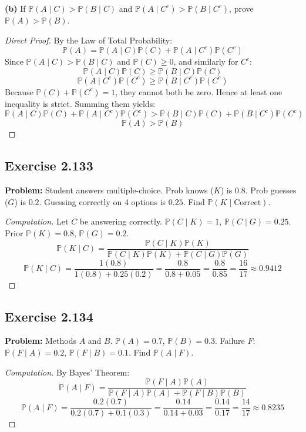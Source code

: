 \documentclass[12pt]{article}
\theoremstyle{definition}
\theoremstyle{remark}
\newcommand{\Pbb}{\mathbb{P}}
\begin{document}
\textbf{(b)} If $\Pbb(A \mid C) > \Pbb(B \mid C)$ and $\Pbb(A \mid C^c) > \Pbb(B \mid C^c)$, prove $\Pbb(A) > \Pbb(B)$.
\begin{proof}[Direct Proof]
By the Law of Total Probability:
\[ \Pbb(A) = \Pbb(A \mid C)\Pbb(C) + \Pbb(A \mid C^c)\Pbb(C^c) \]
Since $\Pbb(A \mid C) > \Pbb(B \mid C)$ and $\Pbb(C) \ge 0$, and similarly for $C^c$:
\[ \Pbb(A \mid C)\Pbb(C) \ge \Pbb(B \mid C)\Pbb(C) \]
\[ \Pbb(A \mid C^c)\Pbb(C^c) \ge \Pbb(B \mid C^c)\Pbb(C^c) \]
Because $\Pbb(C) + \Pbb(C^c) = 1$, they cannot both be zero. Hence at least one inequality is strict. Summing them yields:
\[ \Pbb(A \mid C)\Pbb(C) + \Pbb(A \mid C^c)\Pbb(C^c) > \Pbb(B \mid C)\Pbb(C) + \Pbb(B \mid C^c)\Pbb(C^c) \]
\[ \Pbb(A) > \Pbb(B) \]
\end{proof}

\subsection*{Exercise 2.133}
\textbf{Problem:} Student answers multiple-choice. Prob knows ($K$) is $0.8$. Prob guesses ($G$) is $0.2$. Guessing correctly on 4 options is $0.25$. Find $\Pbb(K \mid \text{Correct})$.
\begin{proof}[Computation]
Let $C$ be answering correctly. $\Pbb(C \mid K) = 1$, $\Pbb(C \mid G) = 0.25$. Prior $\Pbb(K) = 0.8$, $\Pbb(G) = 0.2$.
\[ \Pbb(K \mid C) = \frac{\Pbb(C \mid K)\Pbb(K)}{\Pbb(C \mid K)\Pbb(K) + \Pbb(C \mid G)\Pbb(G)} \]
\[ \Pbb(K \mid C) = \frac{1(0.8)}{1(0.8) + 0.25(0.2)} = \frac{0.8}{0.8 + 0.05} = \frac{0.8}{0.85} = \frac{16}{17} \approx 0.9412 \]
\end{proof}

\subsection*{Exercise 2.134}
\textbf{Problem:} Methods $A$ and $B$. $\Pbb(A)=0.7$, $\Pbb(B)=0.3$. Failure $F$: $\Pbb(F \mid A)=0.2$, $\Pbb(F \mid B)=0.1$. Find $\Pbb(A \mid F)$.
\begin{proof}[Computation]
By Bayes' Theorem:
\[ \Pbb(A \mid F) = \frac{\Pbb(F \mid A)\Pbb(A)}{\Pbb(F \mid A)\Pbb(A) + \Pbb(F \mid B)\Pbb(B)} \]
\[ \Pbb(A \mid F) = \frac{0.2(0.7)}{0.2(0.7) + 0.1(0.3)} = \frac{0.14}{0.14 + 0.03} = \frac{0.14}{0.17} = \frac{14}{17} \approx 0.8235 \]
\end{proof}
\end{document}
